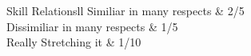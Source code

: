 \begin{stable}{Skill Relations}{ll}
		Similiar in many respects     &       2/5 \\
		Dissimiliar in many respects  &       1/5 \\
		Really Stretching it		  &       1/10 \\ \hline
\end{stable}
